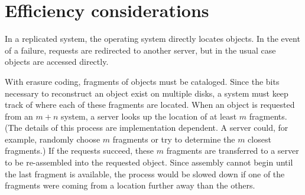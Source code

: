 \section{Efficiency considerations}

In a replicated system, the operating system directly locates objects. In the event of a failure, requests are redirected to another server, but in the usual case objects are accessed directly. 

With erasure coding, fragments of objects must be cataloged. Since the bits necessary to reconstruct an object exist on multiple disks, a system must keep track of where each of these fragments are located. When an object is requested from an $m+n$ system, a server looks up the location of at least $m$ fragments. (The details of this process are implementation dependent. A server could, for example, randomly choose $m$ fragments or try to determine the $m$ closest fragments.) If the requests succeed, these $m$ fragments are transferred to a server to be re-assembled into the requested object. Since assembly cannot begin until the last fragment is available, the process would be slowed down if one of the fragments were coming from a location further away than the others.

